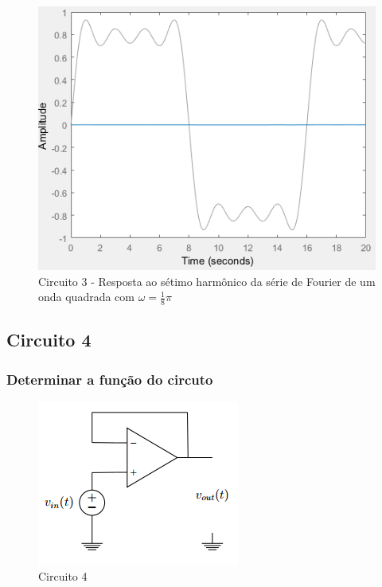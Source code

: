 \documentclass[a4paper, 12pt]{article}
\begin{document}
			\begin{figure}[!ht]
				\centering
				\includegraphics[scale=0.71]{img/1m_circ3.png}
				\caption{Circuito 3 - Resposta ao sétimo harmônico da série de Fourier de um onda quadrada com $\omega = \frac{1}{8}\pi$}
			\end{figure}
		\subsection{Circuito 4}
			\subsubsection{Determinar a função do circuto}
			\begin{figure}[!ht]
				\centering
				\includegraphics{img/circuito4.png}
				\caption{Circuito 4}
			\end{figure}
\end{document}
